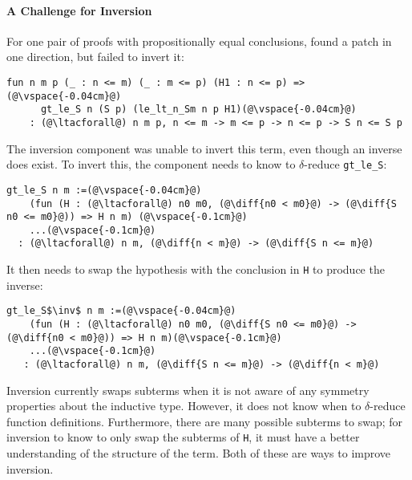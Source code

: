 \paragraph{A Challenge for Inversion} For one pair of proofs with propositionally equal conclusions,
\sysname found a patch in one direction, but failed to invert it:

\begin{lstlisting}[language=coq]
    fun n m p (_ : n <= m) (_ : m <= p) (H1 : n <= p) =>(@\vspace{-0.04cm}@)
      gt_le_S n (S p) (le_lt_n_Sm n p H1)(@\vspace{-0.04cm}@)
    : (@\ltacforall@) n m p, n <= m -> m <= p -> n <= p -> S n <= S p
\end{lstlisting}

The inversion component was unable to invert this term, even though an inverse does exist.
To invert this, the component needs to know to $\delta$-reduce \lstinline{gt_le_S}:

\begin{lstlisting}[language=coq]
  gt_le_S n m :=(@\vspace{-0.04cm}@)
    (fun (H : (@\ltacforall@) n0 m0, (@\diff{n0 < m0}@) -> (@\diff{S n0 <= m0}@)) => H n m) (@\vspace{-0.1cm}@)
    ...(@\vspace{-0.1cm}@)
  : (@\ltacforall@) n m, (@\diff{n < m}@) -> (@\diff{S n <= m}@)
\end{lstlisting}

It then needs to swap the hypothesis with the conclusion in \lstinline{H} to produce the inverse:

\begin{lstlisting}[language=coq]
  gt_le_S$\inv$ n m :=(@\vspace{-0.04cm}@)
    (fun (H : (@\ltacforall@) n0 m0, (@\diff{S n0 <= m0}@) -> (@\diff{n0 < m0}@)) => H n m)(@\vspace{-0.1cm}@)
    ...(@\vspace{-0.1cm}@)
   : (@\ltacforall@) n m, (@\diff{S n <= m}@) -> (@\diff{n < m}@)
\end{lstlisting}

Inversion currently swaps subterms when it is not
aware of any symmetry properties about the inductive type. However,
it does not know when to $\delta$-reduce function definitions. Furthermore, 
there are many possible subterms to swap;
for inversion to know to only swap the subterms of \lstinline{H}, it must have a better
understanding of the structure of the term. Both of these are ways to improve inversion.

